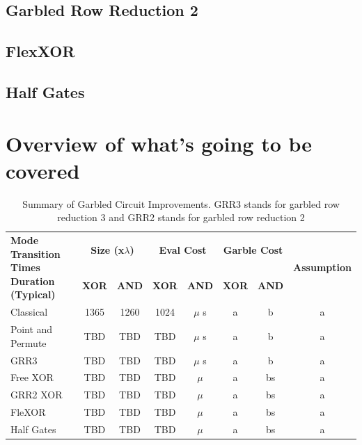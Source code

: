 \documentclass[12pt,twoside]{reedthesis}
\begin{document}
\subsection{Garbled Row Reduction 2}
\subsection{FlexXOR}
\subsection{Half Gates}

\section{Overview of what's going to be covered}

\begin{table}[h]
  \centering
  \renewcommand{\arraystretch}{1.2}
\begin{adjustbox}{width=1\textwidth}
  \begin{tabular}{|p{5cm}||c|c||c|c||c|c||c|}
    \hline
    \multirow{2}{5cm}{\centering \textbf{Mode Transition Times Duration (Typical)}} & 
    \multicolumn{2}{c|}{\textbf{Size (x$\lambda$)}} & 
    \multicolumn{2}{c|}{\textbf{Eval Cost}} & 
    \multicolumn{2}{c|}{\textbf{Garble Cost}} &
    \multirow{2}{3cm}{\centering \textbf{Assumption}} \\
    \cline{2-7}
    & \textbf{XOR} & \textbf{AND} & \textbf{XOR} & \textbf{AND}  & \textbf{XOR} & \textbf{AND} & \\
    \hline
    Classical & 1365 & 1260 & 1024 & $\mu$ s & a & b & a\\ \hline
    Point and Permute & TBD & TBD & TBD & $\mu$ s & a & b & a\\ \hline
    GRR3 & TBD & TBD & TBD & $\mu$ s  & a & b& a\\ \hline
    Free XOR & TBD & TBD & TBD & $\mu$ & a & bs& a  \\ \hline
    GRR2 XOR & TBD & TBD & TBD & $\mu$ & a & bs  & a\\ \hline
    FleXOR& TBD & TBD & TBD & $\mu$ & a & bs & a \\ \hline
    Half Gates & TBD & TBD & TBD & $\mu$ & a & bs & a \\ \hline
  \end{tabular}
  \end{adjustbox}
  \caption{Summary of Garbled Circuit Improvements. GRR3 stands for garbled row reduction 3 and GRR2 stands for garbled row reduction 2}
\end{table}
\end{document}
